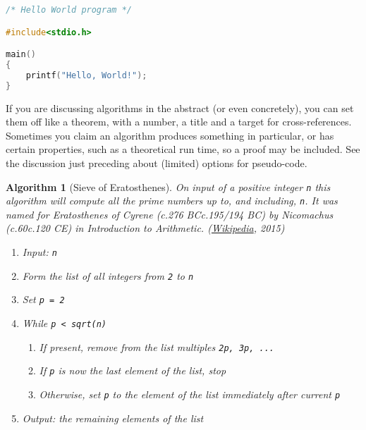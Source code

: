 \documentclass[10pt,]{article}
\theoremstyle{plain}
\newtheorem{algorithm}[theorem]{Algorithm}
\theoremstyle{definition}
\theoremstyle{definition}
\theoremstyle{definition}
\theoremstyle{definition}
\theoremstyle{definition}
\theoremstyle{definition}
\numberwithin{equation}{section}
\newenvironment{listing}{\par\bigskip\noindent}{}
\begin{document}
\begin{listing}
\begin{lstlisting}[style=genericinput, language=C]
/* Hello World program */

#include<stdio.h>

main()
{
    printf("Hello, World!");
}
\end{lstlisting}
\par
{}

\end{listing}
\hypertarget{p-626}{}%
If you are discussing algorithms in the abstract (or even concretely), you can set them off like a theorem, with a number, a title and a target for cross-references.  Sometimes you claim an algorithm produces something in particular, or has certain properties, such as a theoretical run time, so a proof may be included.  See the discussion just preceding about (limited) options for pseudo-code.%
\begin{algorithm}[{Sieve of Eratosthenes}]\label{algorithm-sieve-eratosthenes}
\hypertarget{p-627}{}%
On input of a positive integer \lstinline?n? this algorithm will compute all the prime numbers up to, and including, \lstinline?n?.  It was named for Eratosthenes of Cyrene (c.\@ 276 BC\textendash{}c.\@ 195/194 BC) by Nicomachus (c.\@ 60\textendash{}c.\@ 120 CE) in \textsl{Introduction to Arithmetic}. (\href{http://en.wikipedia.org/wiki/Sieve_of_Eratosthenes}{Wikipedia}, 2015)\leavevmode%
\begin{enumerate}
\item\hypertarget{li-224}{}Input: \lstinline?n?%
\item\hypertarget{li-225}{}Form the list of all integers from \lstinline?2? to \lstinline?n?%
\item\hypertarget{li-226}{}Set \lstinline?p = 2?%
\item\hypertarget{li-227}{}\hypertarget{p-628}{}%
While \lstinline?p < sqrt(n)?%
\begin{enumerate}[label=\arabic*.]
\item\hypertarget{li-228}{}If present, remove from the list multiples \lstinline?2p, 3p, ...?%
\item\hypertarget{li-229}{}If \lstinline?p? is now the last element of the list, stop%
\item\hypertarget{li-230}{}Otherwise, set \lstinline?p? to the element of the list immediately after current \lstinline?p?%
\end{enumerate}
%
\item\hypertarget{li-231}{}Output: the remaining elements of the list%
\end{enumerate}
%
\end{algorithm}
\end{document}
